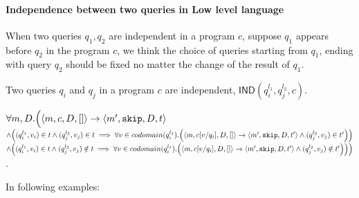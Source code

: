 \documentclass[a4paper,11pt]{article}
\begin{document}
\paragraph{Independence between two queries in Low level language}
%
When two queries $q_1,q_2$ are independent in a program $c$, suppose $q_1$ appears before $q_2$ in the program $c$, we think the choice of queries starting from $q_1$, ending with query $q_2$ should be fixed no matter the change of the result of $q_1$.\\
%
\begin{defn}
Two queries $q_i$ and $q_j$ in a program $c$ are independent, $\mathsf{IND}(q^{l_1}_i, q^{l_2}_j, c)$.

$\forall m, D. 
\Big( 
\langle m, c, D, [] \rangle \rightarrow \langle m', \mathtt{skip}, D, t \rangle 
$\\
$\land 
\left((q^{l_1}_i, v_i) \in t \land (q^{l_2}_j, v_j) \in t  \implies \forall v \in codomain(q^{l_1}_i). 
\left( \config{m, c[v/q_i], D, []} \rightarrow \config{m', \eskip, D, t'} \land (q^{l_2}_j, v_j) \in t'
\right)
\right)$
\\
$
\land 
\left( (q^{l_1}_i, v_i) \in t \land (q^{l_2}_j, v_j) \notin t  \implies \forall v\in codomain(q^{l_1}_i). 
\left( \config{m, c[v/q_i], D, []} \rightarrow \config{m', \eskip, D, t'} \land (q^{l_2}_j, v_j) \notin t'
\right)
\right)
\Big ) $.
\end{defn}
%
\noindent
In following examples:
\end{document}
